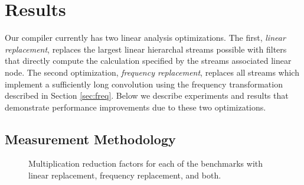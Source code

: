 \section{Results}
\label{sec:results}

Our compiler currently has two linear analysis optimizations. The first,
{\it linear replacement}, replaces the largest linear hierarchal streams 
possible with filters that directly compute the calculation specified by 
the streams associated linear node. The second optimization, 
{\it frequency replacement}, replaces all streams which implement 
a sufficiently long convolution using the frequency transformation described in 
Section \ref{sec:freq}. Below we describe experiments and results that demonstrate
performance improvements due to these two optimizations.

\subsection{Measurement Methodology}


\begin{figure}[t]
\vspace{-6pt}
\center
\epsfxsize=3.2in
\vspace{-6pt}
\caption{Multiplication reduction factors for each of the benchmarks with linear replacement, frequency replacement, and both.}
\label{fig:linear-freq-both}
\vspace{-12pt}
\end{figure}


